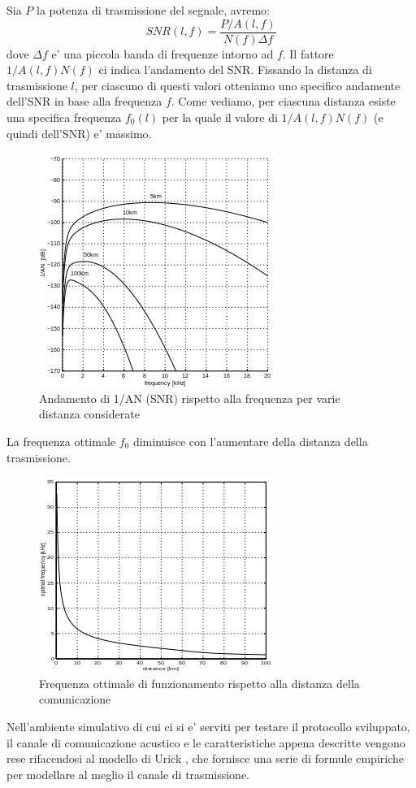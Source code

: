 Sia $P$ la potenza di trasmissione del segnale, avremo:
\[SNR(l, f) = \frac{P/A(l, f)}{N(f)\Delta f}\]
dove $\Delta f $ e' una piccola banda di frequenze intorno ad $f$. Il fattore $1/A(l, f)N(f)$ ci indica l'andamento del SNR. Fissando la distanza di trasmissione $l$, per ciascuno di questi valori otteniamo uno specifico andamente dell'SNR in base alla frequenza $f$. Come vediamo, per ciascuna distanza esiste una specifica frequenza $f_0(l)$ per la quale il valore di $1/A(l, f)N(f)$ (e quindi dell'SNR) e' massimo.
\begin{figure}[H]
\centering
    \includegraphics[]{snr.png}
    \caption{Andamento di 1/AN (SNR) rispetto alla frequenza per varie distanza considerate}
\end{figure}

La frequenza ottimale $f_0$ diminuisce con l'aumentare della distanza della trasmissione.
\begin{figure}[H]
    \centering
    \includegraphics[]{optimalfreq.png}
    \caption{Frequenza ottimale di funzionamento rispetto alla distanza della comunicazione}
\end{figure}
\par
Nell'ambiente simulativo di cui ci si e' serviti per testare il protocollo sviluppato, il canale di comunicazione acustico e le caratteristiche appena descritte vengono rese rifacendosi al modello di Urick \cite{urick}, che fornisce una serie di formule empiriche per modellare al meglio il canale di trasmissione.


